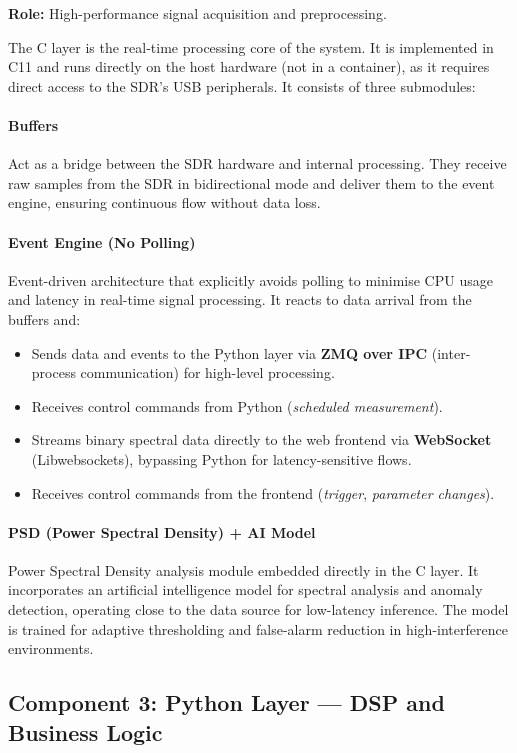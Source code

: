 \documentclass[12pt,a4paper]{article}
\begin{document}
\textbf{Role:} High-performance signal acquisition and preprocessing.

The C layer is the real-time processing core of the system. It is implemented in C11 and runs directly on the host hardware (not in a container), as it requires direct access to the SDR's USB peripherals. It consists of three submodules:

\paragraph{Buffers}
Act as a bridge between the SDR hardware and internal processing. They receive raw samples from the SDR in bidirectional mode and deliver them to the event engine, ensuring continuous flow without data loss.

\paragraph{Event Engine (No Polling)}
Event-driven architecture that explicitly avoids polling to minimise CPU usage and latency in real-time signal processing. It reacts to data arrival from the buffers and:
\begin{itemize}
  \item Sends data and events to the Python layer via \textbf{ZMQ over IPC} (inter-process communication) for high-level processing.
  \item Receives control commands from Python (\textit{scheduled measurement}).
  \item Streams binary spectral data directly to the web frontend via \textbf{WebSocket} (Libwebsockets), bypassing Python for latency-sensitive flows.
  \item Receives control commands from the frontend (\textit{trigger}, \textit{parameter changes}).
\end{itemize}

\paragraph{PSD (Power Spectral Density) + AI Model}
Power Spectral Density analysis module embedded directly in the C layer. It incorporates an artificial intelligence model for spectral analysis and anomaly detection, operating close to the data source for low-latency inference. The model is trained for adaptive thresholding and false-alarm reduction in high-interference environments.

\subsection{Component 3: Python Layer --- DSP and Business Logic}
\end{document}
